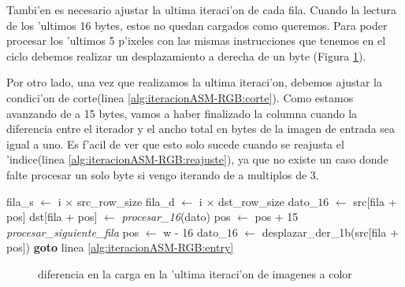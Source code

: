 Tambi'en es necesario ajustar la ultima iteraci'on de cada fila. Cuando la lectura de los 'ultimos 16 bytes, estos no quedan cargados como queremos. Para poder procesar los 'ultimos 5 p'ixeles con las mismas instrucciones que tenemos en el ciclo debemos realizar un desplazamiento a derecha de un byte (Figura \ref{est:ciclo}).

Por otro lado, una vez que realizamos la ultima iteraci'on, debemos ajustar la condici'on de corte(linea \ref{alg:iteracionASM-RGB:corte}). Como estamos avanzando de a 15 bytes, vamos a haber finalizado la columna cuando la diferencia entre el iterador y el ancho total en bytes de la imagen de entrada sea igual a uno. Es f'acil de ver que esto solo sucede cuando se reajusta el 'indice(linea \ref{alg:iteracionASM-RGB:reajuste}), ya que no existe un caso donde falte procesar un solo byte si vengo iterando de a multiplos de 3.

\begin{algorithm}[h!]
\caption{}\label{alg:iteracionASM-RGB}
\begin{algorithmic}[1]
	\STATE fila_s $\leftarrow$ i $\times$ src\_row\_size	
	\STATE fila_d $\leftarrow$ i $\times$ dst\_row\_size
		\STATE dato_{$16$} $\leftarrow$ src[fila + pos]
		\STATE dst[fila + pos] $\leftarrow$ \textit{procesar_{16}}(dato)
		\label{alg:iteracionASM-RGB:entry}
		\STATE pos $\leftarrow$ pos + 15		
		 		\label{alg:iteracionASM-RGB:corte}
			\STATE \textit{procesar\_siguiente\_fila}
			\STATE pos $\leftarrow$ w - 16 \label{alg:iteracionASM-RGB:reajuste}
			\STATE dato_{$16$} $\leftarrow$ desplazar\_der_{1b}(src[fila + pos]) 
			\STATE \textbf{goto} linea \ref{alg:iteracionASM-RGB:entry}
		\ENDIF		
	\ENDFOR
\ENDFOR
\end{algorithmic}
\end{algorithm}


\begin{figure}[hb]
\caption{diferencia en la carga en la 'ultima iteraci'on de imagenes a color}
\label{est:ciclo}
\end{figure}

